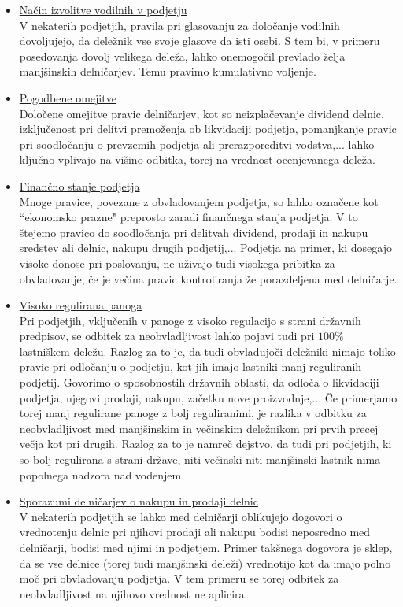 \documentclass[12pt,a4paper]{amsart}
\theoremstyle{definition} %
\theoremstyle{plain} %
\begin{document}
\begin{itemize}
\item\underline{Način izvolitve vodilnih v podjetju}\\
V nekaterih podjetjih, pravila pri glasovanju za določanje vodilnih dovoljujejo, da deležnik vse svoje glasove da isti osebi. S tem bi, v primeru posedovanja dovolj velikega deleža, lahko onemogočil prevlado želja manjšinskih delničarjev. Temu pravimo kumulativno voljenje.
\item\underline{Pogodbene omejitve}\\
Določene omejitve pravic delničarjev, kot so neizplačevanje dividend delnic, izključenost pri delitvi premoženja ob likvidaciji podjetja, pomanjkanje pravic pri soodločanju o prevzemih podjetja ali prerazporeditvi vodstva,... lahko ključno vplivajo na višino odbitka, torej na vrednost ocenjevanega deleža.
\item\underline{Finančno stanje podjetja}\\%
Mnoge pravice, povezane z obvladovanjem podjetja, so lahko označene kot ``ekonomsko prazne" preprosto zaradi finančnega stanja podjetja. V to štejemo pravico do soodločanja pri delitvah dividend, prodaji in nakupu sredstev ali delnic, nakupu drugih podjetij,... Podjetja na primer, ki dosegajo visoke donose pri poslovanju, ne uživajo tudi visokega pribitka za obvladovanje, če je večina pravic kontroliranja že porazdeljena med delničarje. 
\item\underline{Visoko regulirana panoga}\\
Pri podjetjih, vključenih v panoge z visoko regulacijo s strani državnih predpisov, se odbitek za neobvladljivost lahko pojavi tudi pri $100\%$ lastniškem deležu. Razlog za to je, da tudi obvladujoči deležniki nimajo toliko pravic pri odločanju o podjetju, kot jih imajo lastniki manj reguliranih podjetij. Govorimo o sposobnostih državnih oblasti, da odloča o likvidaciji podjetja, njegovi prodaji, nakupu, začetku nove proizvodnje,... Če primerjamo torej manj regulirane panoge z bolj reguliranimi, je razlika v odbitku za neobvladljivost med manjšinskim in večinskim deležnikom pri prvih precej večja kot pri drugih. Razlog za to je namreč dejstvo, da tudi pri podjetjih, ki so bolj regulirana s strani države, niti večinski niti manjšinski lastnik nima popolnega nadzora nad vodenjem.
\item\underline{Sporazumi delničarjev o nakupu in prodaji delnic}\\
V nekaterih podjetjih se lahko med delničarji oblikujejo dogovori o vrednotenju delnic pri njihovi prodaji ali nakupu bodisi neposredno med delničarji, bodisi med njimi in podjetjem. Primer takšnega dogovora je sklep, da se vse delnice (torej tudi manjšinski deleži) vrednotijo kot da imajo polno moč pri obvladovanju podjetja. V tem primeru se torej odbitek za neobvladljivost na njihovo vrednost ne aplicira.

\end{itemize}
\end{document}
